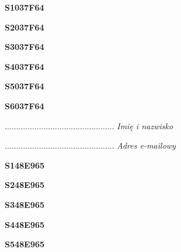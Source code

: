 \begin{turn}{90}\huge \textbf{S1037F64}\end{turn}

\begin{turn}{90}\huge \textbf{S2037F64}\end{turn}

\begin{turn}{90}\huge \textbf{S3037F64}\end{turn}

\begin{turn}{90}\huge \textbf{S4037F64}\end{turn}

\begin{turn}{90}\huge \textbf{S5037F64}\end{turn}

\begin{turn}{90}\huge \textbf{S6037F64}\end{turn}

\begin{turn}{90}\begin{minipage}{\linewidth} \vspace{20mm} ................................................  \textit{Imię i nazwisko}\end{minipage}\end{turn}

\begin{turn}{90}\begin{minipage}{\linewidth} \vspace{20mm} ................................................  \textit{Adres e-mailowy}\end{minipage}\end{turn}

\begin{turn}{90}\huge \textbf{S148E965}\end{turn}

\begin{turn}{90}\huge \textbf{S248E965}\end{turn}

\begin{turn}{90}\huge \textbf{S348E965}\end{turn}

\begin{turn}{90}\huge \textbf{S448E965}\end{turn}

\begin{turn}{90}\huge \textbf{S548E965}\end{turn}


